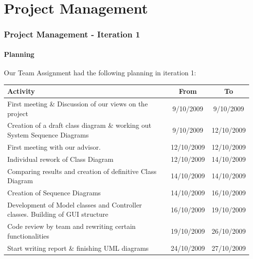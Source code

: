 	\part{Project Management}
	
	\section{Project Management - Iteration 1}
		\subsection{Planning}
		Our Team Assignment had the following planning in iteration 1:\\
		\begin{tabular}{p{200 pt}|c|c}
		Activity & From & To\\
		\hline
		First meeting \& Discussion of our views on the project & 9/10/2009 & 9/10/2009\\ \hline
		Creation of a draft class diagram \& working out System Sequence Diagrams & 9/10/2009 & 12/10/2009\\ \hline
		First meeting with our advisor. & 12/10/2009 & 12/10/2009\\ \hline
		Individual rework of Class Diagram & 12/10/2009 & 14/10/2009\\ \hline
		Comparing results and creation of definitive Class Diagram & 14/10/2009 & 14/10/2009\\ \hline
		Creation of Sequence Diagrams & 14/10/2009 & 16/10/2009\\ \hline
		Development of Model classes and Controller classes. Building of GUI structure & 16/10/2009 & 19/10/2009\\ \hline
		Code review by team and rewriting certain functionalities & 19/10/2009 & 26/10/2009\\ \hline
		Start writing report \& finishing UML diagrams & 24/10/2009 & 27/10/2009\\ \hline
		\end{tabular}
